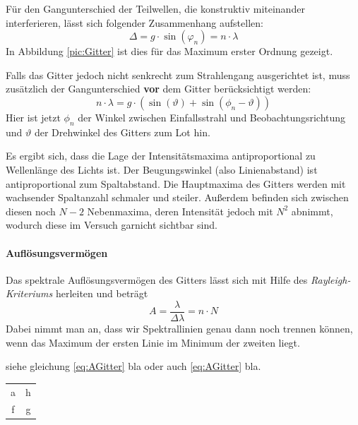\documentclass[a4paper, 11pt]{article}
\begin{document}
Für den Gangunterschied  der Teilwellen, die konstruktiv miteinander interferieren, lässt sich folgender Zusammenhang aufstellen:
\begin{equation}\label{eq:IGitter}
	\Delta = g \cdot \sin(\varphi_n) = n \cdot \lambda
\end{equation}
In Abbildung \ref{pic:Gitter} ist dies für das Maximum erster Ordnung gezeigt.

Falls das Gitter jedoch nicht senkrecht zum Strahlengang ausgerichtet ist, muss zusätzlich der Gangunterschied \textbf{vor} dem Gitter berücksichtigt werden:
\begin{equation}\label{eq:GitterVerdreht}
	n \cdot \lambda = g \cdot (\sin(\vartheta)+\sin(\phi_n-\vartheta))
\end{equation}
Hier ist jetzt $\phi_n$ der Winkel zwischen Einfallsstrahl und Beobachtungsrichtung und $\vartheta$ der Drehwinkel des Gitters zum Lot hin.

Es ergibt sich, dass die Lage der Intensitätsmaxima antiproportional zu Wellenlänge des Lichts ist. Der Beugungswinkel (also Linienabstand) ist antiproportional zum Spaltabstand.
Die Hauptmaxima des Gitters werden mit wachsender Spaltanzahl schmaler und steiler. Außerdem befinden sich zwischen diesen noch $N-2$ Nebenmaxima, deren Intensität jedoch mit $N^2$ abnimmt, wodurch diese im Versuch garnicht sichtbar sind.


\clearpage
\paragraph{Auflösungsvermögen}
Das spektrale Auflösungsvermögen des Gitters lässt sich mit Hilfe des \textit{Rayleigh-Kriteriums} herleiten und beträgt
\begin{equation}\label{eq:AGitter}
	A = \frac{\lambda}{\Delta\lambda} = n \cdot N
\end{equation}
Dabei nimmt man an, dass wir Spektrallinien genau dann noch trennen können, wenn das Maximum der ersten Linie im Minimum der zweiten liegt.

siehe gleichung \eqref{eq:AGitter} bla oder auch \ref{eq:AGitter} bla.

\begin{table}[H]
	\begin{tabular}{|c|c|}
		\hline \hline
		a & h \\
		f & g \\ \hline
	\end{tabular}
\end{table}
\end{document}
